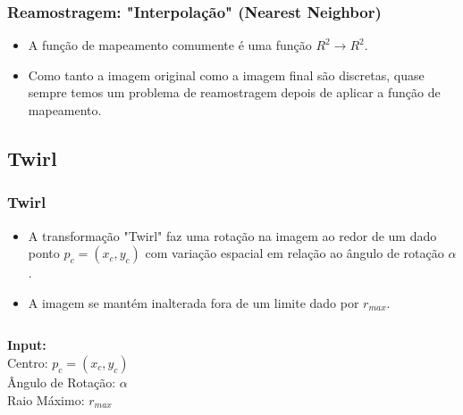 \documentclass{beamer}
\begin{document}
\begin{frame}
  \frametitle{Reamostragem: "Interpolação" (Nearest Neighbor)}
\begin{itemize}
 \item A função de mapeamento comumente é uma função $R^2 \rightarrow R^2$.
 \item Como tanto a imagem original como a imagem final são discretas, quase
sempre temos um problema de reamostragem depois de aplicar a função de
mapeamento.
\end{itemize}
\begin{center}
\end{center}
\end{frame}

\subsection{Twirl}
\begin{frame}
\frametitle{Twirl}
\begin{itemize}
 \item A transformação "Twirl" faz uma rotação na imagem ao redor de um dado
ponto $p_c = (x_c, y_c)$ com variação espacial em relação ao ângulo de rotação
$\alpha$.
 \item A imagem se mantém inalterada fora de um limite dado por $r_{max}$.
\end{itemize}

\begin{columns}[c]
\column{1.5in}
\textbf{Input:} \\
Centro: $p_c = (x_c, y_c)$ \\
Ângulo de Rotação: $\alpha$ \\
Raio Máximo: $r_{max}$ 
\column{1.5in}
\end{columns}
\end{frame}
\end{document}
